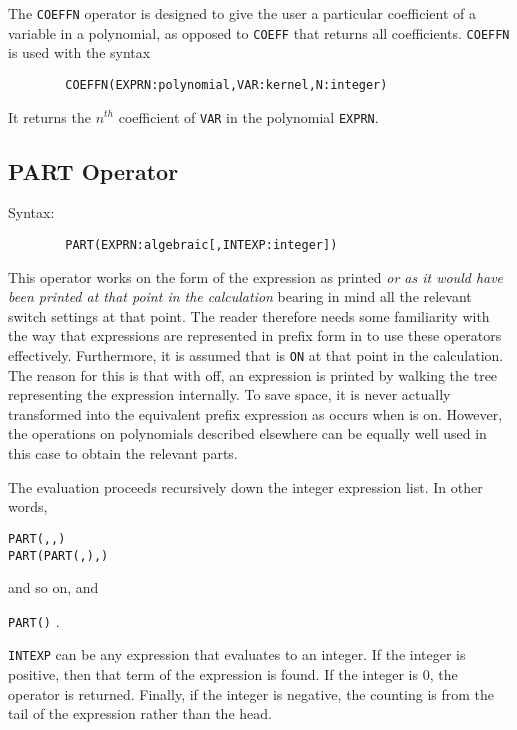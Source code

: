 The \texttt{COEFFN} operator is designed to give the user a particular
coefficient of a variable in a polynomial, as opposed to \texttt{COEFF} that
returns all coefficients. \texttt{COEFFN} is used with the syntax
\begin{verbatim}
        COEFFN(EXPRN:polynomial,VAR:kernel,N:integer)
\end{verbatim}
It returns the $n^{th}$ coefficient of \texttt{VAR} in the polynomial
\texttt{EXPRN}.

\subsection{PART Operator}
\hypertarget{operator:PART}{}
Syntax:
\begin{verbatim}
        PART(EXPRN:algebraic[,INTEXP:integer])
\end{verbatim}

This operator works on the form of the expression as printed \emph{or as it
would have been printed at that point in the calculation} bearing in mind
all the relevant switch settings at that point.  The reader therefore
needs some familiarity with the way that expressions are represented in
prefix form in {\REDUCE} to use these operators effectively.  Furthermore,
it is assumed that  is \texttt{ON} at that point in the calculation.
The reason for this is that with  off, an expression is printed
by walking the tree representing the expression internally.  To save
space, it is never actually transformed into the equivalent prefix
expression as occurs when  is on.  However, the operations on
polynomials described elsewhere can be equally well used in this case to
obtain the relevant parts.

The evaluation proceeds recursively down the integer expression list. In
other words,
\begin{syntaxtable}
 \texttt{PART(}\texttt{,}\texttt{,}\texttt{)} \\
  \qquad \rightarrow \texttt{PART(PART(}\texttt{,}\texttt{),}\texttt{)}
\end{syntaxtable}
 and so on, and
\begin{syntax}
  \texttt{PART(}\texttt{)}  \rightarrow {} .
\end{syntax}
\texttt{INTEXP} can be any expression that evaluates to an integer.  If the
integer is positive, then that term of the expression is found.  If the
integer is 0, the operator is returned.  Finally, if the integer is
negative, the counting is from the tail of the expression rather than the
head.

